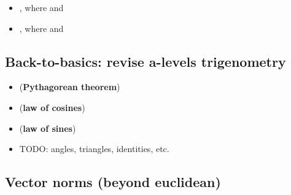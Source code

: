 \begin{itemize}
\begin{itemize}
                \begin{itemize}

                  \item
                        , where
                         and
                  \item
                        , where
                         and
                \end{itemize}
        \end{itemize}
\end{itemize}

\subsection*{Back-to-basics: revise a-levels
  trigenometry}

\begin{itemize}

  \item
         (\textbf{Pythagorean theorem})
  \item
         (\textbf{law of
          cosines})
  \item
        (\textbf{law of sines})
  \item
        TODO: angles, triangles, identities, etc.
\end{itemize}

\subsection*{Vector norms (beyond
  euclidean)}

